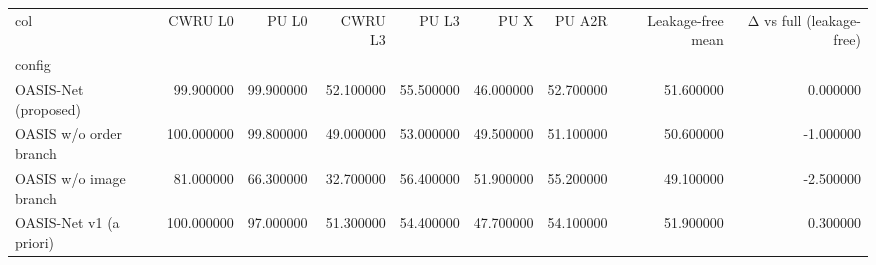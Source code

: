 \begin{tabular}{lrrrrrrrr}
\toprule
col & CWRU L0 & PU L0 & CWRU L3 & PU L3 & PU X & PU A2R & Leakage-free mean & Δ vs full (leakage-free) \\
config &  &  &  &  &  &  &  &  \\
\midrule
OASIS-Net (proposed) & 99.900000 & 99.900000 & 52.100000 & 55.500000 & 46.000000 & 52.700000 & 51.600000 & 0.000000 \\
OASIS w/o order branch & 100.000000 & 99.800000 & 49.000000 & 53.000000 & 49.500000 & 51.100000 & 50.600000 & -1.000000 \\
OASIS w/o image branch & 81.000000 & 66.300000 & 32.700000 & 56.400000 & 51.900000 & 55.200000 & 49.100000 & -2.500000 \\
OASIS-Net v1 (a priori) & 100.000000 & 97.000000 & 51.300000 & 54.400000 & 47.700000 & 54.100000 & 51.900000 & 0.300000 \\
\bottomrule
\end{tabular}
